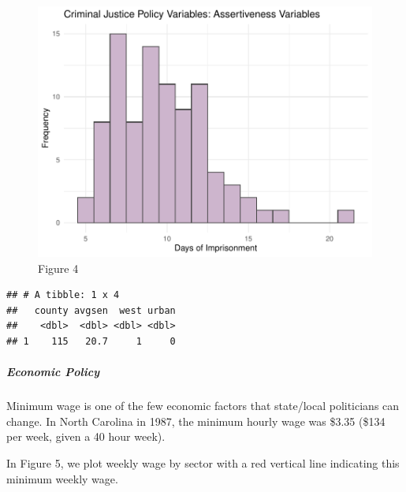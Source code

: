 \documentclass[]{article}
\newenvironment{Shaded}{\begin{snugshade}}{\end{snugshade}}
\newcommand{\KeywordTok}[1]{\textcolor[rgb]{0.13,0.29,0.53}{\textbf{#1}}}
\newcommand{\NormalTok}[1]{#1}
\newcommand{\OperatorTok}[1]{\textcolor[rgb]{0.81,0.36,0.00}{\textbf{#1}}}
\newcommand{\StringTok}[1]{\textcolor[rgb]{0.31,0.60,0.02}{#1}}
\let\oldsubparagraph\subparagraph
\renewcommand{\subparagraph}[1]{\oldsubparagraph{#1}\mbox{}}
\begin{document}
\begin{figure}

{\centering \includegraphics{lab_3_final_files/figure-latex/unnamed-chunk-16-1} 

}

\caption{Figure 4}\label{fig:unnamed-chunk-16}
\end{figure}

\begin{Shaded}
\end{Shaded}

\begin{verbatim}
## # A tibble: 1 x 4
##   county avgsen  west urban
##    <dbl>  <dbl> <dbl> <dbl>
## 1    115   20.7     1     0
\end{verbatim}

\hypertarget{economic-policy-1}{%
\subparagraph{Economic Policy}\label{economic-policy-1}}

Minimum wage is one of the few economic factors that state/local
politicians can change. In North Carolina in 1987, the minimum hourly
wage was \$3.35 (\$134 per week, given a 40 hour week).

In Figure 5, we plot weekly wage by sector with a red vertical line
indicating this minimum weekly wage.
\end{document}

